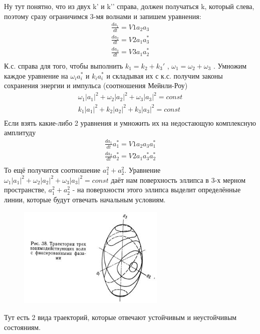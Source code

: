 \documentclass[10pt, a4paper]{article}
\begin{document}
Ну тут понятно, что из двух k’ и k’’ справа, должен получаться k, который слева, поэтому сразу ограничимся 3-мя волнами и запишем уравнения:
\begin{align}
	\frac{d a_1}{dt}=V1 a_2 a_3 \\
	\frac{d a_2}{dt}=V2 a_1 a^{*}_3 \\
	\frac{d a_3}{dt}=V3 a_1 a^{*}_2 \\
\end{align}
К.с. справа для того, чтобы выполнить $k_1=k_2+k_3'$ , $\omega_1=\omega_2+\omega_3$ . 
Умножим каждое уравнение на $\omega_i a^{*}_i$ и $k_i a^{*}_i$ и складывая их с к.с. получим законы сохранения энергии и импульса (соотношения Мейнли-Роу) 
\begin{align}
	\omega_1 |a_1|^2 + \omega_2 |a_2|^2 + \omega_3 |a_3|^2 = const \\
	k_1 |a_1|^2+ k_2 |a_2|^2 + k_3 |a_3|^2  = const \\	
\end{align}
Если взять какие-либо 2 уравнения и умножить их на недостающую комплексную амплитуду
\begin{align}
	\frac{d a_1}{dt} a^{*}_1=V1 a_2 a_3 a^{*}_1 \\
	\frac{d a_2}{dt} a^{*}_2=V2 a_1 a^{*}_3 a^{*}_2 \\
\end{align}
То ещё получится соотношение $a^{2}_1+a^{2}_2$.
Уравнение  $\omega_1 |a_1|^2 + \omega_2 |a_2|^2 + \omega_3 |a_3|^2 = const$ даёт нам поверхность эллипса в 3-х мерном пространстве,  $a^{2}_1+a^{2}_2$ - на поверхности этого эллипса выделит определённые линии, которые будут отвечать начальным условиям.

\begin{figure}[h!]
	\begin{center}
		\includegraphics[width=70mm]{Wavetrans1.JPG}
	\end{center}
\end{figure}

Тут есть 2 вида траекторий, которые отвечают устойчивым и неустойчивым состояниям.
\end{document}
